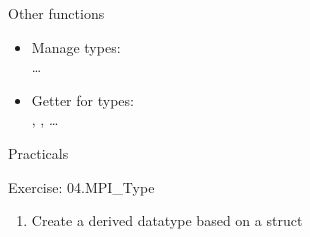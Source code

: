 \documentclass[aspectratio=43]{beamer}
\begin{document}
\begin{frame}[fragile]{Other functions}
\begin{itemize}
    \item Manage types:\\\hspace{1cm} \ldots
    \item Getter for types:\\\hspace{1cm}, , \ldots
\end{itemize}
\end{frame}


\begin{frame}{Practicals}
    \begin{brown2block}{Exercise: 04.MPI\_Type}
    \begin{enumerate}
    \item Create a derived datatype based on a struct
    \end{enumerate}
    \end{brown2block}
\end{frame}



\end{document}
